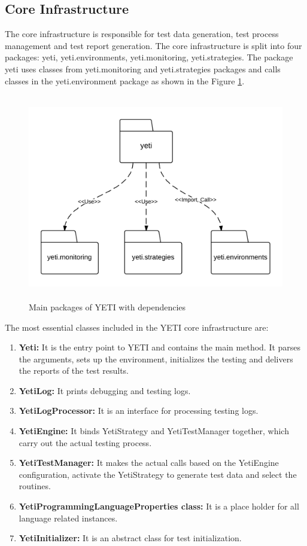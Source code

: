 \subsection{Core Infrastructure}
The core infrastructure is responsible for test data generation, test process management and test report generation. The core infrastructure is split into four packages: yeti, yeti.environments, yeti.monitoring, yeti.strategies. The package yeti uses classes from yeti.monitoring and yeti.strategies packages and calls classes in the yeti.environment package as shown in the Figure \ref{fig:yetiCore}. 
\smallskip
\begin{figure}[h]
	\centering
	\includegraphics[width=14cm, height=9cm]{chapter3/yetiStructure.png}
	\smallskip
	\caption{Main packages of YETI with dependencies }
	\label{fig:yetiCore}
\end{figure}
\bigskip

The most essential classes included in the YETI core infrastructure are:
\begin{enumerate}
\item {\textbf{Yeti:}} It is the entry point to YETI and contains the main method. It parses the arguments, sets up the environment, initializes the testing and delivers the reports of the test results.
\item {\textbf{YetiLog:}} It prints debugging and testing logs. 
\item {\textbf{YetiLogProcessor:}} It is an interface for processing testing logs.
\item {\textbf{YetiEngine:}} It binds YetiStrategy and YetiTestManager together, which carry out the actual testing process.
\item {\textbf{YetiTestManager:}} It makes the actual calls based on the YetiEngine configuration, activate the YetiStrategy to generate test data and select the routines.
\item {\textbf{YetiProgrammingLanguageProperties class:}} It is a place holder for all language related instances.
\item {\textbf{YetiInitializer:}} It is an abstract class for test initialization.
\end{enumerate}

